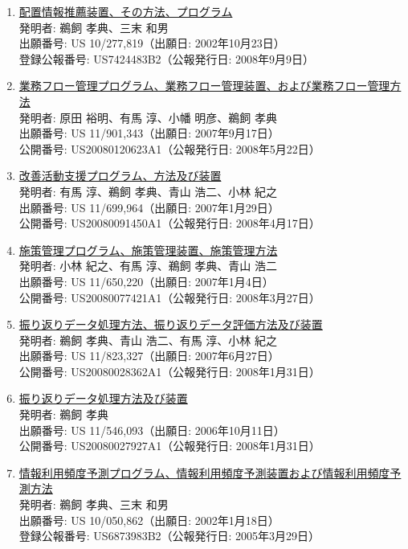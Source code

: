 \documentclass[dvipdfmx]{jlreq}
\begin{document}
\begin{enumerate}[label=\arabic*,align=parleft]
\begin{enumerate}
\item \href{https://patents.google.com/patent/US7424483B2/en}{配置情報推薦装置、その方法、プログラム}\\発明者: 鵜飼 孝典、三末 和男\\出願番号: US 10/277,819（出願日: 2002年10月23日）\\登録公報番号: US7424483B2（公報発行日: 2008年9月9日）
\item \href{https://patents.google.com/patent/US20080120623A1/en}{業務フロー管理プログラム、業務フロー管理装置、および業務フロー管理方法}\\発明者: 原田 裕明、有馬 淳、小幡 明彦、鵜飼 孝典\\出願番号: US 11/901,343（出願日: 2007年9月17日）\\公開番号: US20080120623A1（公報発行日: 2008年5月22日）
\item \href{https://patents.google.com/patent/US20080091450A1/en}{改善活動支援プログラム、方法及び装置}\\発明者: 有馬 淳、鵜飼 孝典、青山 浩二、小林 紀之\\出願番号: US 11/699,964（出願日: 2007年1月29日）\\公開番号: US20080091450A1（公報発行日: 2008年4月17日）
\item \href{https://patents.google.com/patent/US20080077421A1/en}{施策管理プログラム、施策管理装置、施策管理方法}\\発明者: 小林 紀之、有馬 淳、鵜飼 孝典、青山 浩二\\出願番号: US 11/650,220（出願日: 2007年1月4日）\\公開番号: US20080077421A1（公報発行日: 2008年3月27日）
\item \href{https://patents.google.com/patent/US20080028362A1/en}{振り返りデータ処理方法、振り返りデータ評価方法及び装置}\\発明者: 鵜飼 孝典、青山 浩二、有馬 淳、小林 紀之\\出願番号: US 11/823,327（出願日: 2007年6月27日）\\公開番号: US20080028362A1（公報発行日: 2008年1月31日）
\item \href{https://patents.google.com/patent/US20080027927A1/en}{振り返りデータ処理方法及び装置}\\発明者: 鵜飼 孝典\\出願番号: US 11/546,093（出願日: 2006年10月11日）\\公開番号: US20080027927A1（公報発行日: 2008年1月31日）
\item \href{https://patents.google.com/patent/US6873983B2/en}{情報利用頻度予測プログラム、情報利用頻度予測装置および情報利用頻度予測方法}\\発明者: 鵜飼 孝典、三末 和男\\出願番号: US 10/050,862（出願日: 2002年1月18日）\\登録公報番号: US6873983B2（公報発行日: 2005年3月29日）
\end{enumerate}

\end{enumerate}
\end{document}

